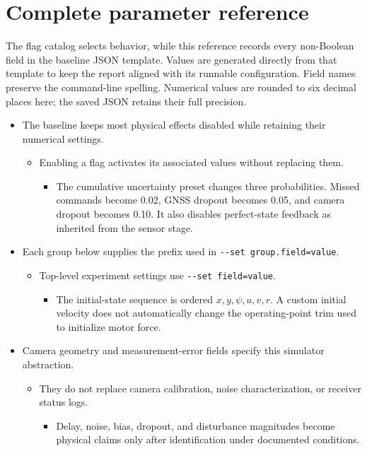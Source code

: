 \documentclass[10pt,letterpaper]{article}
\begin{document}
\clearpage

\section{Complete parameter reference}\label{param-chapter}

The flag catalog selects behavior, while this reference records every non-Boolean field in the baseline JSON template. Values are generated directly from that template to keep the report aligned with its runnable configuration. Field names preserve the command-line spelling. Numerical values are rounded to six decimal places here; the saved JSON retains their full precision.

\begin{itemize}
\item
  The baseline keeps most physical effects disabled while retaining their numerical settings.

  \begin{itemize}
  \item
    Enabling a flag activates its associated values without replacing them.

    \begin{itemize}
    \item
      The cumulative uncertainty preset changes three probabilities. Missed commands become 0.02, GNSS dropout becomes 0.05, and camera dropout becomes 0.10. It also disables perfect-state feedback as inherited from the sensor stage.
    \end{itemize}
  \end{itemize}
\item
  Each group below supplies the prefix used in \texttt{-\/-set\ group.field=value}.

  \begin{itemize}
  \item
    Top-level experiment settings use \texttt{-\/-set\ field=value}.

    \begin{itemize}
    \item
      The initial-state sequence is ordered \(x,y,\psi,u,v,r\). A custom initial velocity does not automatically change the operating-point trim used to initialize motor force.
    \end{itemize}
  \end{itemize}
\item
  Camera geometry and measurement-error fields specify this simulator abstraction.

  \begin{itemize}
  \item
    They do not replace camera calibration, noise characterization, or receiver status logs.

    \begin{itemize}
    \item
      Delay, noise, bias, dropout, and disturbance magnitudes become physical claims only after identification under documented conditions.
    \end{itemize}
  \end{itemize}
\end{itemize}
\end{document}

